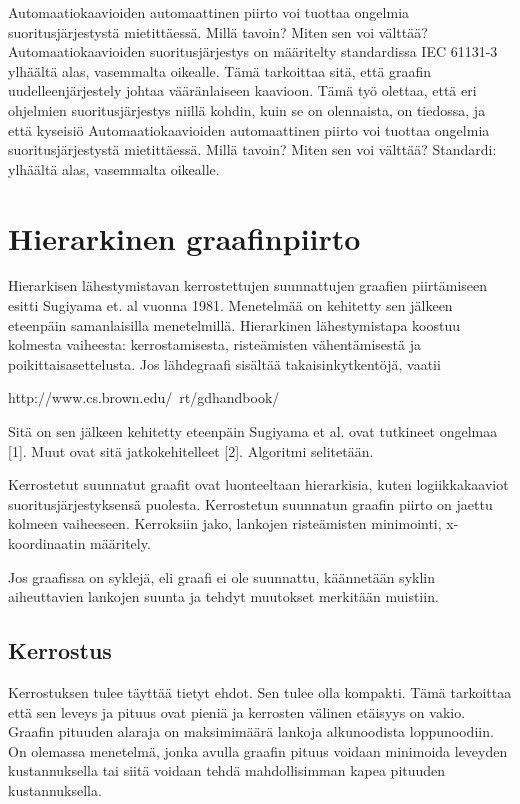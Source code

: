 \documentclass[finnish,12pt]{article}
\begin{document}
Automaatiokaavioiden automaattinen piirto voi tuottaa ongelmia suoritusjärjestystä mietittäessä. 
Millä tavoin?
Miten sen voi välttää?
Automaatiokaavioiden suoritusjärjestys on määritelty standardissa IEC 61131-3 ylhäältä alas, vasemmalta oikealle.
Tämä tarkoittaa sitä, että graafin uudelleenjärjestely johtaa vääränlaiseen kaavioon.
Tämä työ olettaa, että eri ohjelmien suoritusjärjestys niillä kohdin, kuin se on olennaista, on tiedossa, ja että kyseisiö
Automaatiokaavioiden automaattinen piirto voi tuottaa ongelmia suoritusjärjestystä mietittäessä. 
Millä tavoin?
Miten sen voi välttää?
Standardi: ylhäältä alas, vasemmalta oikealle.



	\clearpage
	\section{Hierarkinen graafinpiirto}

Hierarkisen lähestymistavan kerrostettujen suunnattujen graafien piirtämiseen esitti Sugiyama et. al vuonna 1981.
Menetelmää on kehitetty sen jälkeen eteenpäin samanlaisilla menetelmillä.
Hierarkinen lähestymistapa koostuu kolmesta vaiheesta: kerrostamisesta, risteämisten vähentämisestä ja poikittaisasettelusta.
Jos lähdegraafi sisältää takaisinkytkentöjä, vaatii

http://www.cs.brown.edu/~rt/gdhandbook/

Sitä on sen jälkeen kehitetty eteenpäin 
Sugiyama et al. ovat tutkineet ongelmaa [1]. Muut ovat sitä jatkokehitelleet [2]. Algoritmi selitetään.

Kerrostetut suunnatut graafit ovat luonteeltaan hierarkisia, kuten logiikkakaaviot suoritusjärjestyksensä puolesta.
Kerrostetun suunnatun graafin piirto on jaettu kolmeen vaiheeseen. Kerroksiin jako, lankojen risteämisten minimointi, x-koordinaatin määritely.

Jos graafissa on syklejä, eli graafi ei ole suunnattu, käännetään syklin aiheuttavien lankojen suunta ja tehdyt muutokset merkitään muistiin.

		\subsection{Kerrostus}

Kerrostuksen tulee täyttää tietyt ehdot.
Sen tulee olla kompakti.
Tämä tarkoittaa että sen leveys ja pituus ovat pieniä ja kerrosten välinen etäisyys on vakio.
Graafin pituuden alaraja on maksimimäärä lankoja alkunoodista loppunoodiin.
On olemassa menetelmä, jonka avulla graafin pituus voidaan minimoida leveyden kustannuksella tai siitä voidaan tehdä mahdollisimman kapea pituuden kustannuksella.
\end{document}
